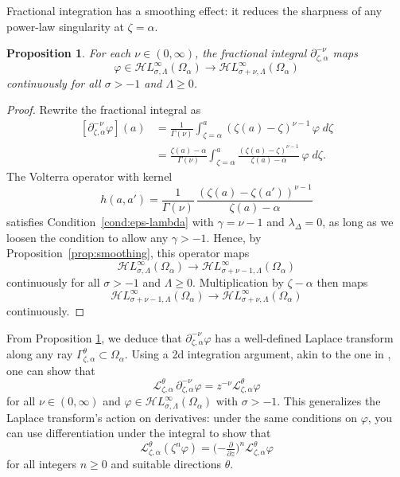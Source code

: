 \documentclass{article}
\theoremstyle{plain}
\newtheorem{prop}{Proposition}
\newcommand{\laplace}{\mathcal{L}}
\newcommand{\fracderiv}[3]{\partial^{#1}_{#2, #3}}
\newcommand{\singexp}[2]{\mathcal{H}L^\infty_{#1, #2}}
\newcommand{\domain}{\Omega}
\begin{document}
Fractional integration has a smoothing effect: it reduces the sharpness of any power-law singularity at $\zeta = \alpha$.
\begin{prop}\label{prop:frac-int-smoothing}
For each $\nu \in (0, \infty)$, the fractional integral $\fracderiv{-\nu}{\zeta}{\alpha}$ maps
\[ \varphi\in\singexp{\sigma}{\Lambda}(\domain_\alpha) \to \singexp{\sigma+\nu}{\Lambda}(\domain_\alpha) \]
continuously for all $\sigma > -1$ and $\Lambda \ge 0$.
\end{prop}
\begin{proof}
Rewrite the fractional integral as
\begin{align*}
\left[\fracderiv{-\nu}{\zeta}{\alpha} \varphi\right](a)&=\frac{1}{\Gamma(\nu)}\int_{\zeta=\alpha}^a (\zeta(a)-\zeta)^{\nu-1} \, \varphi \; d\zeta\\
&=\frac{\zeta(a)-\alpha}{\Gamma(\nu)}\int_{\zeta=\alpha}^a \frac{(\zeta(a)-\zeta)^{\nu-1}}{\zeta(a)- \alpha}\,\varphi \; d\zeta.
\end{align*}
The Volterra operator with kernel
\[ h(a, a') = \frac{1}{\Gamma(\nu)}\,\frac{(\zeta(a)-\zeta(a'))^{\nu-1}}{\zeta(a)- \alpha} \]
satisfies Condition~\eqref{cond:eps-lambda} with $\gamma=\nu-1$ and $\lambda_\Delta=0$, as long as we loosen the condition to allow any $\gamma > -1$. Hence, by Proposition~\ref{prop:smoothing}, this operator maps
\[ \singexp{\sigma}{\Lambda}(\domain_\alpha) \to \singexp{\sigma+\nu-1}{\Lambda}(\domain_\alpha) \]
continuously for all $\sigma > -1$ and $\Lambda \ge 0$. Multiplication by $\zeta - \alpha$ then maps
\[ \singexp{\sigma+\nu-1}{\Lambda}(\domain_\alpha) \to \singexp{\sigma+\nu}{\Lambda}(\domain_\alpha) \]
continuously.
\end{proof}

From Proposition \ref{prop:frac-int-smoothing}, we deduce that $\fracderiv{-\nu}{\zeta}{\alpha}\varphi$ has a well-defined Laplace transform along any ray $\Gamma_{\zeta,\alpha}^{\theta}\subset\domain_\alpha$. Using a 2d integration argument, akin to the one in \cite[Theorem~2.39]{laplace-tfm}, one can show that 
\[ \laplace_{\zeta,\alpha}^{\theta}\,\fracderiv{-\nu}{\zeta}{\alpha} \varphi = z^{-\nu} \laplace_{\zeta, \alpha}^{\theta} \varphi \]
for all $\nu \in (0, \infty)$ and $\varphi\in\singexp{\sigma}{\Lambda}(\domain_\alpha)$ with $\sigma>-1$. This generalizes the Laplace transform's action on derivatives: under the same conditions on $\varphi$, you can use differentiation under the integral to show that~\cite[Theorem~1.34]{laplace-tfm}
\[ \laplace_{\zeta,\alpha}^\theta (\zeta^n \varphi) = \big({-\tfrac{\partial}{\partial z}}\big)^n \laplace_{\zeta,\alpha}^\theta \varphi \]
for all integers $n \ge 0$ and suitable directions $\theta$.
\end{document}
